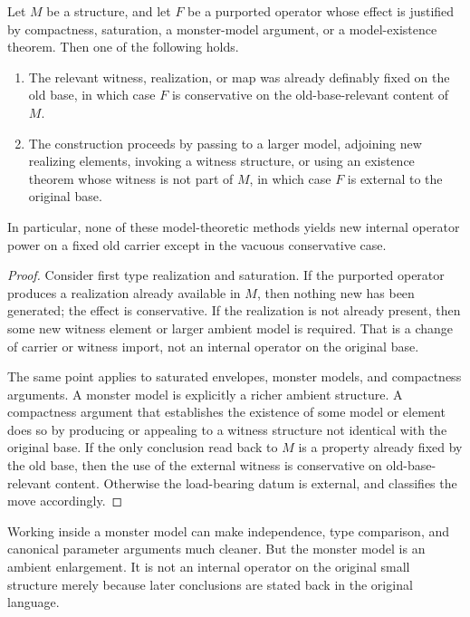 \begin{proposition}\label{prop:case-model-theory}
Let $M$ be a structure, and let $F$ be a purported operator whose effect is justified by compactness, saturation, a monster-model argument, or a model-existence theorem. Then one of the following holds.
\begin{enumerate}[label=(\alph*)]
    \item The relevant witness, realization, or map was already definably fixed on the old base, in which case $F$ is conservative on the old-base-relevant content of $M$.
    \item The construction proceeds by passing to a larger model, adjoining new realizing elements, invoking a witness structure, or using an existence theorem whose witness is not part of $M$, in which case $F$ is external to the original base.
\end{enumerate}
In particular, none of these model-theoretic methods yields new internal operator power on a fixed old carrier except in the vacuous conservative case.
\end{proposition}

\begin{proof}
Consider first type realization and saturation. If the purported operator produces a realization already available in $M$, then nothing new has been generated; the effect is conservative. If the realization is not already present, then some new witness element or larger ambient model is required. That is a change of carrier or witness import, not an internal operator on the original base.

The same point applies to saturated envelopes, monster models, and compactness arguments. A monster model is explicitly a richer ambient structure. A compactness argument that establishes the existence of some model or element does so by producing or appealing to a witness structure not identical with the original base. If the only conclusion read back to $M$ is a property already fixed by the old base, then the use of the external witness is conservative on old-base-relevant content. Otherwise the load-bearing datum is external, and  classifies the move accordingly.
\end{proof}

\begin{example}
Working inside a monster model can make independence, type comparison, and canonical parameter arguments much cleaner. But the monster model is an ambient enlargement. It is not an internal operator on the original small structure merely because later conclusions are stated back in the original language.
\end{example}

